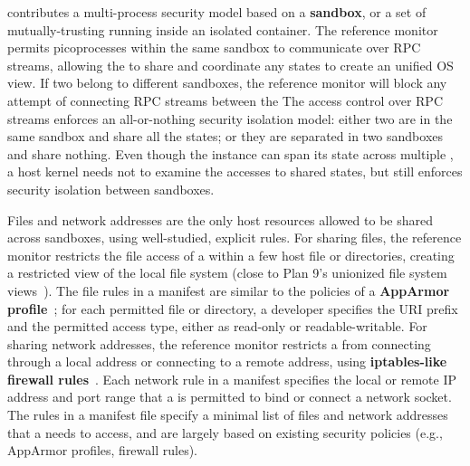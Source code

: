 \graphene{} contributes a multi-process security model 
based on a {\bf sandbox},
or a set of mutually-trusting \picoprocs{} running inside an isolated container.
The reference monitor permits picoprocesses within the same sandbox
to communicate over RPC streams,
allowing the \libos{} to share and coordinate any states
to create an unified OS view.
If two \picoprocs{} belong to different sandboxes,
the reference monitor will block any attempt of connecting RPC streams
between the \picoprocs{}
The access control over RPC streams
enforces an all-or-nothing security isolation model:
either two \picoprocs{} are in the same sandbox and share all the \libos{} states; or they are separated in two sandboxes and share nothing.
Even though the \libos{} instance can span its state across multiple \picoprocs{},
a host kernel needs not to examine the accesses to shared \libos{} states, but still enforces security isolation between sandboxes.




Files and network addresses
are the only host resources allowed to be shared across sandboxes,
using well-studied, explicit rules.
For sharing files, the reference monitor restricts the file access of a \picoproc{}
within a few host file or directories,
creating a restricted view of the local file system
(close to Plan 9's unionized file system views~\cite{pike90plan9}).
The file rules
in a manifest are similar to the policies of a {\bf AppArmor profile}~\cite{apparmor};
for each permitted file or directory,
a developer specifies the URI prefix and the permitted access type, either as read-only or readable-writable. %
For sharing network addresses,
the reference monitor restricts a \picoproc{} from connecting through a local address or connecting to a remote address,
using {\bf iptables-like firewall rules}~\cite{iptablesman}.
Each network rule in a manifest
specifies the local or remote IP address and port range that a \picoproc{} is permitted to bind or connect a network socket.
The rules in a manifest file
specify a minimal list of files and network addresses that a \picoproc{} needs to access, and are largely based on existing security policies (e.g., AppArmor profiles, firewall rules).





